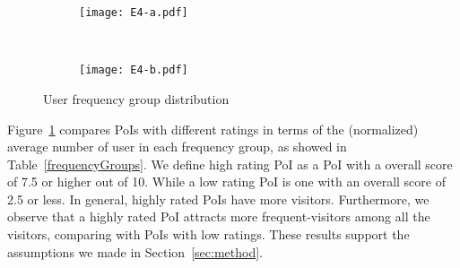 \begin{figure}[htbp]%
        \centering
        \begin{subfigure}{0.25\textwidth}
               \texttt{[image: E4-a.pdf]}
        \end{subfigure}%
        ~ %
        \begin{subfigure}{0.25\textwidth}
                \texttt{[image: E4-b.pdf]}
        \end{subfigure}
         \caption{User frequency group distribution}\label{E4}
         \vspace{-2mm}
\end{figure}

Figure~\ref{E4} compares PoIs with different ratings in terms of the (normalized) average number of user in each frequency group, as showed in Table~\ref{frequencyGroups}. We define high rating PoI as a PoI with a overall score of 7.5 or higher out of 10. While a low rating PoI is one with an overall score of 2.5 or less. In general, highly rated PoIs have more visitors. Furthermore, we observe that a highly rated PoI attracts more frequent-visitors among all the visitors, comparing with PoIs with low ratings. These results support the assumptions we made in Section~\ref{sec:method}.
